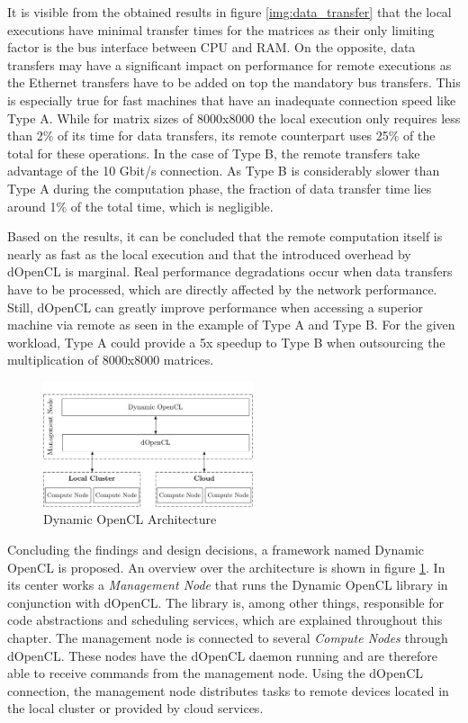 It is visible from the obtained results in figure \ref{img:data_transfer} that the local executions have minimal transfer times for the matrices as their only limiting factor is the bus interface between CPU and RAM. On the opposite, data transfers may have a significant impact on performance for remote executions as the Ethernet transfers have to be added on top the mandatory bus transfers. This is especially true for fast machines that have an inadequate connection speed like Type A. While for matrix sizes of 8000x8000 the local execution only requires less than 2\% of its time for data transfers, its remote counterpart uses 25\% of the total for these operations. In the case of Type B, the remote transfers take advantage of the 10 Gbit/s connection. As Type B is considerably slower than Type A during the computation phase, the fraction of data transfer time lies around 1\% of the total time, which is negligible.

Based on the results, it can be concluded that the remote computation itself is nearly as fast as the local execution and that the introduced overhead by dOpenCL is marginal. Real performance degradations occur when data transfers have to be processed, which are directly affected by the network performance. Still, dOpenCL can greatly improve performance when accessing a superior machine via remote as seen in the example of Type A and Type B. For the given workload, Type A could provide a 5x speedup to Type B when outsourcing the multiplication of 8000x8000 matrices.

\begin{figure}[H]

	\includegraphics[width=0.55\textwidth]{drawings/dynamic_opencl_arch.pdf}
	\centering
	\caption{Dynamic OpenCL Architecture}
	\label{img:dynamic_opencl_arch}
\end{figure}
Concluding the findings and design decisions, a framework named Dynamic OpenCL is proposed. An overview over the architecture is shown in figure \ref{img:dynamic_opencl_arch}. In its center works a \textit{Management Node} that runs the Dynamic OpenCL library in conjunction with dOpenCL. The library is, among other things, responsible for code abstractions and scheduling services, which are explained throughout this chapter. The management node is connected to several \textit{Compute Nodes} through dOpenCL. These nodes have the dOpenCL daemon running and are therefore able to receive commands from the management node. Using the dOpenCL connection, the management node distributes tasks to remote devices located in the local cluster or provided by cloud services.


